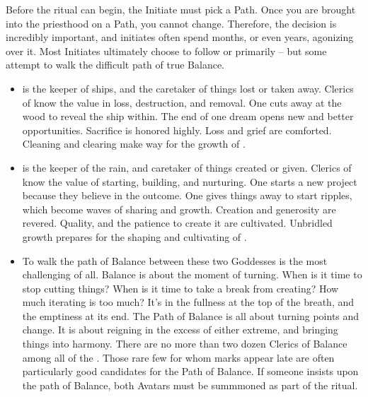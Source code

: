 \documentclass[blue]{GL2020}
\begin{document}
Before the ritual can begin, the Initiate must pick a Path. Once you are brought into the priesthood on a Path, you cannot change. Therefore, the decision is incredibly important, and initiates often spend months, or even years, agonizing over it. Most Initiates ultimately choose to follow \cEbb{} or \cFlow{} primarily -- but some attempt to walk the difficult path of true Balance. 
\begin{itemize}
  \item \cEbb{\full} is the keeper of ships, and the caretaker of things lost or taken away. Clerics of \cEbb{} know the value in loss, destruction, and removal. One cuts away at the wood to reveal the ship within. The end of one dream opens new and better opportunities. Sacrifice is honored highly. Loss and grief are comforted. Cleaning and clearing make way for the growth of \cFlow{}. 
  \item \cFlow{\full} is the keeper of the rain, and caretaker of things created or given. Clerics of \cFlow{} know the value of starting, building, and nurturing. One starts a new project because they believe in the outcome. One gives things away to start ripples, which become waves of sharing and growth. Creation and generosity are revered. Quality, and the patience to create it are cultivated. Unbridled growth prepares for the shaping and cultivating of \cEbb{}.
  \item To walk the path of Balance between these two Goddesses is the most challenging of all. Balance is about the moment of turning. When is it time to stop cutting things? When is it time to take a break from creating? How much iterating is too much? It's in the fullness at the top of the breath, and the emptiness at its end. The Path of Balance is all about turning points and change. It is about reigning in the excess of either extreme, and bringing things into harmony. There are no more than two dozen Clerics of Balance among all of the \pShippies{}. Those rare few for whom marks appear late are often particularly good candidates for the Path of Balance. If someone insists upon the path of Balance, both Avatars must be summmoned as part of the ritual.
\end{itemize}
\end{document}
